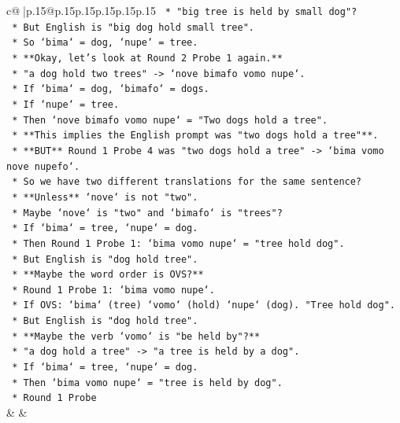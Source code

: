 \documentclass{article}
\begin{document}
{\begin{supertabular}{c@{$\;$}|p{.15\linewidth}@{}p{.15\linewidth}p{.15\linewidth}p{.15\linewidth}p{.15\linewidth}p{.15\linewidth}}
{{{\texttt{            *   "big tree is held by small dog"?} \\
\texttt{            *   But English is "big dog hold small tree".} \\
\texttt{            *   So `bima` = dog, `nupe` = tree.} \\
\texttt{            *   **Okay, let's look at Round 2 Probe 1 again.**} \\
\texttt{            *   "a dog hold two trees" {-}> `nove bimafo vomo nupe`.} \\
\texttt{            *   If `bima` = dog, `bimafo` = dogs.} \\
\texttt{            *   If `nupe` = tree.} \\
\texttt{            *   Then `nove bimafo vomo nupe` = "Two dogs hold a tree".} \\
\texttt{            *   **This implies the English prompt was "two dogs hold a tree"**.} \\
\texttt{            *   **BUT** Round 1 Probe 4 was "two dogs hold a tree" {-}> `bima vomo nove nupefo`.} \\
\texttt{            *   So we have two different translations for the same sentence?} \\
\texttt{            *   **Unless** `nove` is not "two".} \\
\texttt{            *   Maybe `nove` is "two" and `bimafo` is "trees"?} \\
\texttt{            *   If `bima` = tree, `nupe` = dog.} \\
\texttt{            *   Then Round 1 Probe 1: `bima vomo nupe` = "tree hold dog".} \\
\texttt{            *   But English is "dog hold tree".} \\
\texttt{            *   **Maybe the word order is OVS?**} \\
\texttt{            *   Round 1 Probe 1: `bima vomo nupe`.} \\
\texttt{            *   If OVS: `bima` (tree) `vomo` (hold) `nupe` (dog). "Tree hold dog".} \\
\texttt{            *   But English is "dog hold tree".} \\
\texttt{            *   **Maybe the verb `vomo` is "be held by"?**} \\
\texttt{            *   "a dog hold a tree" {-}> "a tree is held by a dog".} \\
\texttt{            *   If `bima` = tree, `nupe` = dog.} \\
\texttt{            *   Then `bima vomo nupe` = "tree is held by dog".} \\
\texttt{            *   Round 1 Probe} \\
            }
        }
    }
    & & \\ \\


\end{supertabular}}
\end{document}
